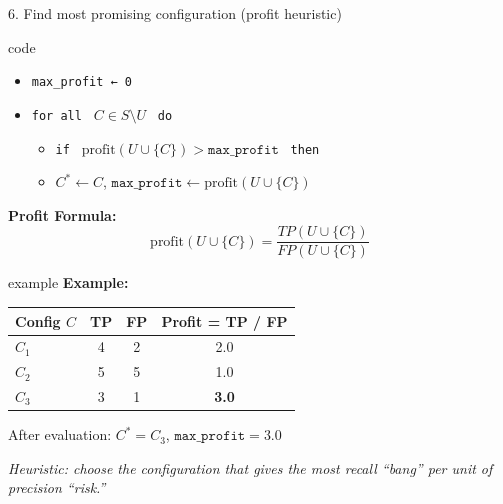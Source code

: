 \documentclass[8pt]{beamer} %
\begin{document}
\begin{frame}{6. Find most promising configuration (profit heuristic)}
	
	\begin{beamercolorbox}[rounded=true, shadow=true, leftskip=1em, rightskip=1em]{code}	
	\begin{itemize}
		\item[] \texttt{max\_profit ← 0}
		\item[] \texttt{for all } $C \in S \setminus U$ \texttt{ do}
		\begin{itemize}
			\item[] \texttt{if } $\text{profit}(U \cup \{C\}) > \texttt{max\_profit}$ \texttt{ then}
			\item[] \quad $C^* \leftarrow C$, $\texttt{max\_profit} \leftarrow \text{profit}(U \cup \{C\})$
		\end{itemize}
	\end{itemize}
	\end{beamercolorbox}
	
	\vspace{0.5em}
	\textbf{Profit Formula:}
	$$
	\text{profit}(U \cup \{C\}) = \frac{TP(U \cup \{C\})}{FP(U \cup \{C\})}
	$$
	
	\vspace{0.5em}
	\begin{beamercolorbox}[rounded=true, shadow=true, leftskip=1em, rightskip=1em]{example}		
	\textbf{Example:}
	\begin{tabular}{lccc}
		\textbf{Config $C$} & \textbf{TP} & \textbf{FP} & \textbf{Profit = TP / FP} \\
		\hline
		$C_1$ & 4 & 2 & 2.0 \\
		$C_2$ & 5 & 5 & 1.0 \\
		$C_3$ & 3 & 1 & \textbf{3.0} \\
	\end{tabular}
	
	\vspace{0.5em}
	After evaluation: $C^* = C_3$, $\texttt{max\_profit} = 3.0$
	\end{beamercolorbox}
	
	\vspace{0.5em}

	\textit{Heuristic: choose the configuration that gives the most recall “bang” per unit of precision “risk.”}

\end{frame}
\end{document}
